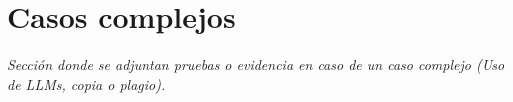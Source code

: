 \section*{Casos complejos}

\textit{Sección donde se adjuntan pruebas o evidencia en caso de un caso
complejo (Uso de LLMs, copia o plagio).}
